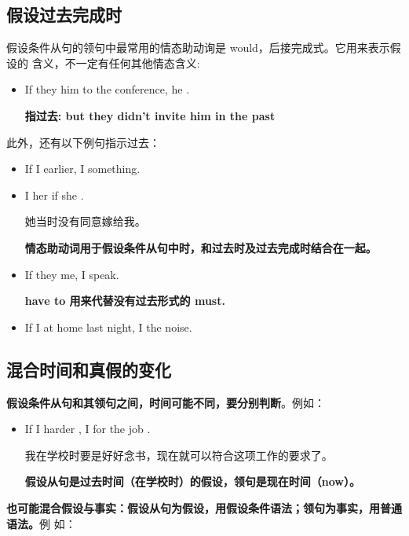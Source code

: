 \subsection{假设过去完成时}

假设条件从句的领句中最常用的情态助动询是 would，后接完成式。它用来表示假设的
含义，不一定有任何其他情态含义:
\begin{itemize}
\item If they  him to the conference, he .

  \textbf{指过去: but they didn't invite him in the past}
\end{itemize}

此外，还有以下例句指示过去：
\begin{itemize}
\item If I  earlier, I  something.

\item I  her if she .

  她当时没有同意嫁给我。

  \textbf{情态助动词用于假设条件从句中时，和过去时及过去完成时结合在一起。}

\item If they  me, I  speak.

  \textbf{have to 用来代替没有过去形式的 must.}

\item If I  at home last night, I  the noise.
\end{itemize}


\subsection{混合时间和真假的变化}

\textbf{假设条件从句和其领句之间，时间可能不同，要分别判断}。例如：
\begin{itemize}
\item If I  harder , I  for the job
  .

  我在学校时要是好好念书，现在就可以符合这项工作的要求了。

  \textbf{假设从句是过去时间（在学校时）的假设，领句是现在时间（now）。}
\end{itemize}

\textbf{也可能混合假设与事实：假设从句为假设，用假设条件语法；领句为事实，用普通语法。}例
如：

